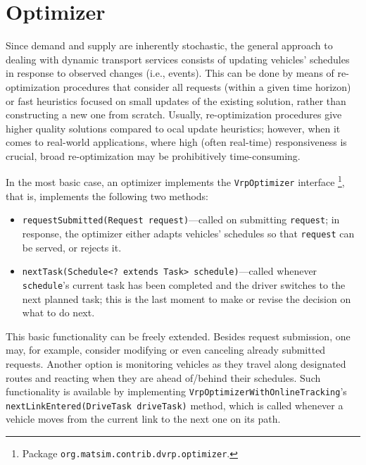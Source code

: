 \section{Optimizer}
\label{sec:VRP-optimizer}
Since demand and supply are inherently stochastic, the general approach to dealing with dynamic transport services consists of updating vehicles' schedules in response to observed changes (i.e., events). This can be done by means of re-optimization procedures that consider all requests (within a given time horizon) or fast heuristics focused on small updates of the existing solution, rather than constructing a new one from scratch. Usually, re-optimization procedures give higher quality  solutions compared to ocal update heuristics; however, when it comes to real-world applications, where high (often real-time) responsiveness is crucial, broad re-optimization may be prohibitively time-consuming.

In the most basic case, an optimizer implements the \lstinline$VrpOptimizer$ interface%
\footnote{
Package \lstinline$org.matsim.contrib.dvrp.optimizer$.
},
that is, implements the following two methods:
%
\begin{itemize}
	\item \lstinline$requestSubmitted(Request request)$---called on submitting \lstinline$request$; in response, the optimizer either adapts vehicles' schedules so that \lstinline$request$ can be served, or rejects it.
	
	\item \lstinline$nextTask(Schedule<? extends Task> schedule)$---called whenever \lstinline$schedule$'s current task has been completed and the driver switches to the next planned task; this is the last moment to make or revise the decision on what to do next.

\end{itemize}

This basic functionality can be freely extended. Besides request submission, one may, for example, consider modifying or even canceling already submitted requests. Another option is monitoring vehicles as they travel along designated routes and reacting when they are ahead of/behind their schedules. Such functionality is available by implementing \lstinline$VrpOptimizerWithOnlineTracking$'s \lstinline$nextLinkEntered(DriveTask driveTask)$ method, which is called whenever a vehicle moves from the current link to the next one on its path.

